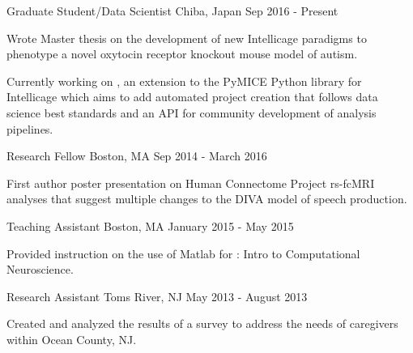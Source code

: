 \vspace*{0.35cm}

\begin{cventries}

    {Graduate Student/Data Scientist}
    {Chiba, Japan}
    {Sep 2016 - Present}
    {\begin{cvitems}
        \item{Wrote 
            {Master thesis} on the development of new Intellicage paradigms to phenotype
            a novel oxytocin receptor knockout mouse model of autism.}
        \item{Currently working on , an extension to the
            PyMICE Python library for Intellicage which aims to add automated project
            creation that follows data science best standards and an API for community
            development of analysis pipelines.}
    \end{cvitems}}
    \vspace*{0.2cm}
    
    {Research Fellow}
    {Boston, MA}
    {Sep 2014 - March 2016}
    {\begin{cvitems}
        \item{First author 
            {poster presentation} on Human Connectome Project rs-fcMRI analyses that
            suggest multiple changes to the DIVA model of speech production.}
    \end{cvitems}}
    \vspace*{0.2cm}
    
    {Teaching Assistant}
    {Boston, MA}
    {January 2015 - May 2015}
    {\begin{cvitems}
        \item{Provided instruction on the use of Matlab for : Intro to Computational Neuroscience.}
    \end{cvitems}}
    \vspace*{0.2cm}
    
    {Research Assistant}
    {Toms River, NJ}
    {May 2013 - August 2013}
    {\begin{cvitems}
        \item{Created and analyzed the results of a 
            {survey} to address the needs of caregivers within Ocean County, NJ.}
    \end{cvitems}}
    \vspace*{0.2cm}
    

\end{cventries}
